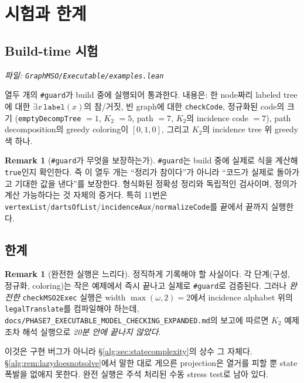 \documentclass[11pt]{article}
\theoremstyle{definition}
\newtheorem{remark}[definition]{Remark}
\theoremstyle{plain}
\newcommand{\lean}[1]{\texttt{#1}}
\newcommand{\leanfile}[1]{\texttt{#1}}
\begin{document}
\section{시험과 한계}
\label{alg:sec:limits}

\subsection{Build-time 시험}

\emph{파일: \leanfile{GraphMSO/Executable/examples.lean}}

열두 개의 \lean{\#guard}가 build 중에 실행되어 통과한다. 내용은:
한 node짜리 labeled tree에 대한 $\exists x\,\lean{label}(x)$의 참/거짓,
빈 graph에 대한 \lean{checkCode}, 정규화된 code의 크기
(\lean{emptyDecompTree} $=1$, $K_2$ $=5$, path $=7$, $K_2$의 incidence code
$=7$), path decomposition의 greedy coloring이 $[0,1,0]$, 그리고 $K_2$의
incidence tree 위 greedy 색 하나.

\begin{remark}[\lean{\#guard}가 무엇을 보장하는가]
\lean{\#guard}는 build 중에 실제로 식을 계산해 \lean{true}인지 확인한다.
즉 이 열두 개는 ``정리가 참이다''가 아니라 ``코드가 실제로 돌아가고 기대한
값을 낸다''를 보장한다. 형식화된 정확성 정리와 독립적인 검사이며, 정의가
계산 가능하다는 것 자체의 증거다. 특히 11번은
\lean{vertexList}/\lean{dartsOfList}/\lean{incidenceAux}/\lean{normalizeCode}를
끝에서 끝까지 실행한다.
\end{remark}

\subsection{한계}

\begin{remark}[완전한 실행은 느리다]
\label{alg:rem:performance}
정직하게 기록해야 할 사실이다. 각 단계(구성, 정규화, coloring)는 작은 예제에서
즉시 끝나고 실제로 \lean{\#guard}로 검증된다. 그러나 \emph{완전한}
\lean{checkMSO2Exec} 실행은 width $\max(\omega,2) = 2$에서 incidence
alphabet 위의 \lean{legalTranslate}를 컴파일해야 하는데,
\leanfile{docs/PHASE7\_EXECUTABLE\_MODEL\_CHECKING\_EXPANDED.md}의 보고에
따르면 $K_2$ 예제조차 해석 실행으로 \emph{20분 안에 끝나지 않았다}.

이것은 구현 버그가 아니라 \S\ref{alg:sec:statecomplexity}의 상수 그 자체다.
\S\ref{alg:rem:lazydoesnotsolve}에서 말한 대로 게으른 projection은 열거를
피할 뿐 state 폭발을 없애지 못한다. 완전 실행은 주석 처리된 수동 stress
test로 남아 있다.
\end{remark}
\end{document}
